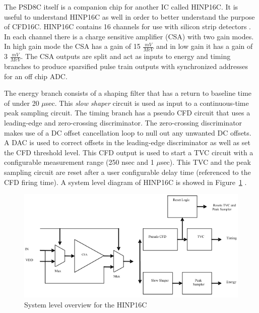 \documentclass[12pt,oneside,final]{siuethesis}
\theoremstyle{definition}
\begin{document}
\par The PSD8C itself is a companion chip for another IC called HINP16C. It is useful to understand HINP16C as well in order to better understand the purpose of CFD16C. HINP16C contains 16 channels for use with silicon strip detectors \cite{HINP}. In each channel there is a charge sensitive amplifier (CSA) with two gain modes. In high gain mode the CSA has a gain of 15 $\frac{mV}{MeV}$ and in low gain it has a gain of 3 $\frac{mV}{MeV}$. The CSA outputs are split and act as inputs to energy and timing branches to produce sparsified pulse train outputs with synchronized addresses for an off chip ADC. 
\par The energy branch consists of a shaping filter that has a return to baseline time of under 20 $\mu$sec. This \emph{slow shaper} circuit is used as input to a continuous-time peak sampling circuit. The timing branch has a pseudo CFD circuit that uses a leading-edge and zero-crossing discriminator. The zero-crossing discriminator makes use of a DC offset cancellation loop to null out any unwanted DC offsets. A DAC is used to correct offsets in the leading-edge discriminator as well as set the CFD threshold level. This CFD output is used to start a TVC circuit with a configurable measurement range (250 nsec and 1 $\mu$sec). This TVC and the peak sampling circuit are reset after a user configurable delay time (referenced to the CFD firing time). A system level diagram of HINP16C is showed in Figure~\ref{fig:HINP} \cite{HINP-THESIS}.

\begin{figure}[ht]
\centering
\includegraphics[scale=1,keepaspectratio=true]{images/HINP_block.png} 
\caption{System level overview for the HINP16C}
\label{fig:HINP}
\end{figure}
\end{document}
